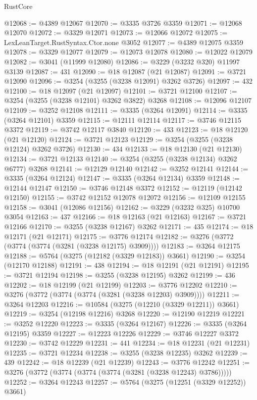 \begin{lexlean}{RustCore}
\begin{coremodule}
@12068 := @4389 @12067
@12070 := @3335 @3726 @3359
@12071 := @12068 @12070
@12072 := @3329 @12071
@12073 := @12066 @12072
@12075 := LexLeanTarget.RustSyntax.Ctor.none @3052
@12077 := @4389 @12075 @3359
@12078 := @3329 @12077
@12079 := @12073 @12078
@12080 := @12022 @12079
@12082 := @3041 (@11999 @12080)
@12086 := @3229 (@3232 @320) @11997 @3139
@12087 := 431
@12090 := @18 @12087 (@21 @12087)
@12091 := @3721 @12090
@12096 := @3254 (@3255 (@3238 @12091) @3262 @3726)
@12097 := 432
@12100 := @18 @12097 (@21 @12097)
@12101 := @3721 @12100
@12107 := @3254 (@3255 (@3238 @12101) @3262 @3822) @3268
@12108 := @12096 @12107
@12109 := @3252 @12108
@12111 := @3335 (@3264 @12091)
@12114 := @3335 (@3264 @12101) @3359
@12115 := @12111 @12114
@12117 := @3746 @12115 @3372
@12119 := @3742 @12117 @3840
@12120 := 433
@12123 := @18 @12120 (@21 @12120)
@12124 := @3721 @12123
@12129 := @3254 (@3255 (@3238 @12124) @3262 @3726)
@12130 := 434
@12133 := @18 @12130 (@21 @12130)
@12134 := @3721 @12133
@12140 := @3254 (@3255 (@3238 @12134) @3262 @6777) @3268
@12141 := @12129 @12140
@12142 := @3252 @12141
@12144 := @3335 (@3264 @12124)
@12147 := @3335 (@3264 @12134) @3359
@12148 := @12144 @12147
@12150 := @3746 @12148 @3372
@12152 := @12119 (@12142 @12150)
@12155 := @3742 @12152 @12078 @12072
@12156 := @12109 @12155
@12158 := @3041 (@12086 @12156)
@12162 := @3229 (@3232 @325) @10700 @3054
@12163 := 437
@12166 := @18 @12163 (@21 @12163)
@12167 := @3721 @12166
@12170 := @3255 (@3238 @12167) @3262
@12171 := 435
@12174 := @18 @12171 (@21 @12171)
@12175 := @3776 @12174
@12182 := @3276 (@3772 (@3774 (@3774 (@3281 (@3238 @12175) @3909))))
@12183 := @3264 @12175
@12188 := @5764 (@3275 (@12182 (@3329 @12183)) @3661)
@12190 := @3254 (@12170 @12188)
@12191 := 438
@12194 := @18 @12191 (@21 @12191)
@12195 := @3721 @12194
@12198 := @3255 (@3238 @12195) @3262
@12199 := 436
@12202 := @18 @12199 (@21 @12199)
@12203 := @3776 @12202
@12210 := @3276 (@3772 (@3774 (@3774 (@3281 (@3238 @12203) @3909))))
@12211 := @3264 @12203
@12216 := @10584 (@3275 (@12210 (@3329 @12211)) @3661)
@12219 := @3254 (@12198 @12216) @3268
@12220 := @12190 @12219
@12221 := @3252 @12220
@12223 := @3335 (@3264 @12167)
@12226 := @3335 (@3264 @12195) @3359
@12227 := @12223 @12226
@12229 := @3746 @12227 @3372
@12230 := @3742 @12229
@12231 := 441
@12234 := @18 @12231 (@21 @12231)
@12235 := @3721 @12234
@12238 := @3255 (@3238 @12235) @3262
@12239 := 439
@12242 := @18 @12239 (@21 @12239)
@12243 := @3776 @12242
@12251 := @3276 (@3772 (@3774 (@3774 (@3774 (@3281 (@3238 @12243) @3786)))))
@12252 := @3264 @12243
@12257 := @5764 (@3275 (@12251 (@3329 @12252)) @3661)

\end{coremodule}
\end{lexlean}
